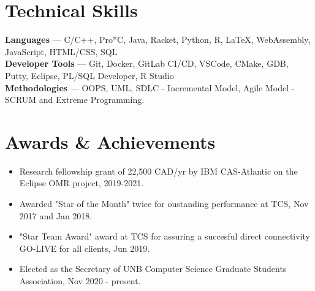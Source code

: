 \documentclass[letterpaper,10pt]{article}
\newcommand{\resumeItem}[1]{
  \item\small{
    {#1 \vspace{-2pt}}
  }
}
\newcommand{\resumeItemListStart}{\begin{itemize}}
\newcommand{\resumeItemListEnd}{\end{itemize}\vspace{-5pt}}
\begin{document}
\section{Technical Skills}
 \begin{itemize}[leftmargin=0.15in, label={}]
    \small{\item{
     \textbf{Languages}{ --- C/C++, Pro*C, Java, Racket, Python, R, \LaTeX{}, WebAssembly, JavaScript, HTML/CSS, SQL} \\
     \textbf{Developer Tools}{ --- Git, Docker, GitLab CI/CD, VSCode, CMake, GDB, Putty, Eclipse, PL/SQL Developer, R Studio} \\
     \textbf{Methodologies}{ --- OOPS, UML, SDLC - Incremental Model, Agile Model - SCRUM and Extreme Programming.}
    }}
 \end{itemize}

%
\section{Awards \& Achievements}
 \begin{itemize}[leftmargin=0.15in, label={}]
    \small{\item{
      \resumeItemListStart
       \resumeItem{Research fellowship grant of 22,500 CAD/yr by IBM CAS-Atlantic on the Eclipse OMR project, 2019-2021. } \\
       \resumeItem{Awarded "Star of the Month" twice for oustanding performance at TCS, Nov 2017 and Jan 2018.} \\
       \resumeItem{"Star Team Award" award at TCS for assuring a succesful direct connectivity GO-LIVE for all clients, Jun 2019.} \\
       \resumeItem{Elected as the Secretary of UNB Computer Science Graduate Students Association, Nov 2020 - present.} \\
       \resumeItemListEnd
    }}
 \end{itemize}
\end{document}
